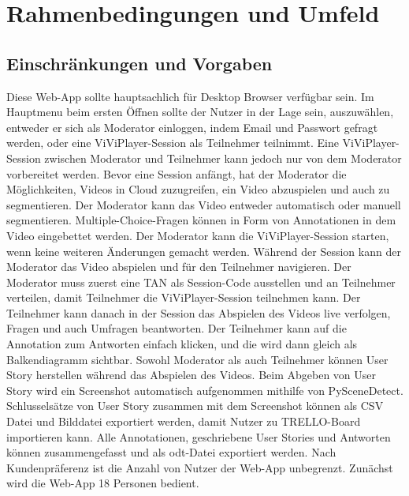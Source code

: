 \section{Rahmenbedingungen und Umfeld}

\subsection{Einschränkungen und Vorgaben}
Diese Web-App sollte hauptsachlich für Desktop Browser verfügbar sein. Im Hauptmenu beim ersten Öffnen sollte der Nutzer in der Lage sein, auszuwählen, entweder er sich als Moderator einloggen, indem Email und Passwort gefragt werden, oder eine ViViPlayer-Session als Teilnehmer teilnimmt. Eine ViViPlayer-Session zwischen Moderator und Teilnehmer kann jedoch nur von dem Moderator vorbereitet werden.\linebreak
\linebreak
Bevor eine Session anfängt, hat der Moderator die Möglichkeiten, Videos in Cloud zuzugreifen, ein Video abzuspielen und auch zu segmentieren. Der Moderator kann 
das Video entweder automatisch oder manuell segmentieren. Multiple-Choice-Fragen können in Form von Annotationen in dem Video eingebettet werden. Der Moderator kann die ViViPlayer-Session starten, wenn keine weiteren Änderungen gemacht werden.\linebreak
\linebreak
Während der Session kann der Moderator das Video abspielen und für den Teilnehmer navigieren. Der Moderator muss zuerst eine TAN als Session-Code ausstellen und an Teilnehmer verteilen, damit Teilnehmer die ViViPlayer-Session teilnehmen kann. Der Teilnehmer kann danach in der Session das Abspielen des Videos live verfolgen, Fragen und auch Umfragen beantworten. Der Teilnehmer kann auf die Annotation zum Antworten einfach klicken, und die wird dann gleich als Balkendiagramm sichtbar. 
Sowohl Moderator als auch Teilnehmer können User Story herstellen während das Abspielen des Videos. Beim Abgeben von User Story wird ein Screenshot automatisch aufgenommen mithilfe von PySceneDetect. Schlusselsätze von User Story zusammen mit dem Screenshot können als CSV Datei und Bilddatei exportiert werden, damit Nutzer zu TRELLO-Board importieren kann. 
Alle Annotationen, geschriebene User Stories und Antworten können zusammengefasst und als odt-Datei exportiert werden.\linebreak
\linebreak
Nach Kundenpräferenz ist die Anzahl von Nutzer der Web-App unbegrenzt. Zunächst wird die Web-App 18 Personen bedient.

